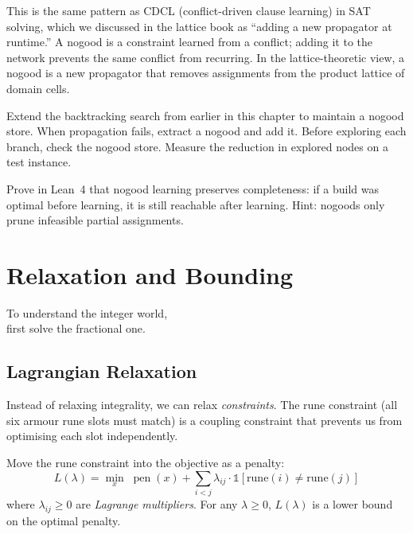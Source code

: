 \documentclass[11pt, a4paper, oneside]{book}
\newcommand{\pen}{\operatorname{pen}}
\begin{document}
\begin{crossrefbox}
This is the same pattern as CDCL (conflict-driven clause learning)
in SAT solving, which we discussed in the lattice book as ``adding
a new propagator at runtime.''  A nogood is a constraint learned from
a conflict; adding it to the network prevents the same conflict from
recurring.  In the lattice-theoretic view, a nogood is a new propagator
that removes assignments from the product lattice of domain cells.
\end{crossrefbox}

\begin{exercisebox}
Extend the backtracking search from earlier in this chapter to maintain
a nogood store.  When propagation fails, extract a nogood and add it.
Before exploring each branch, check the nogood store.  Measure the
reduction in explored nodes on a test instance.
\end{exercisebox}

\begin{exercisebox}
Prove in Lean~4 that nogood learning preserves completeness: if a build
was optimal before learning, it is still reachable after learning.  Hint:
nogoods only prune infeasible partial assignments.
\end{exercisebox}

\chapter{Relaxation and Bounding}
\label{ch:relax}

\epigraph{To understand the integer world,\\first solve the fractional one.}{}

\section{Lagrangian Relaxation}

Instead of relaxing integrality, we can relax \emph{constraints}.  The rune
constraint (all six armour rune slots must match) is a coupling constraint
that prevents us from optimising each slot independently.

\begin{defbox}[title={Lagrangian Relaxation}]
Move the rune constraint into the objective as a penalty:
\[
  L(\lambda) = \min_x \; \pen(x) + \sum_{i < j}
    \lambda_{ij} \cdot \mathbb{1}[\text{rune}(i) \neq \text{rune}(j)]
\]
where $\lambda_{ij} \geq 0$ are \emph{Lagrange multipliers}.  For any
$\lambda \geq 0$, $L(\lambda)$ is a lower bound on the optimal penalty.
\end{defbox}
\end{document}
